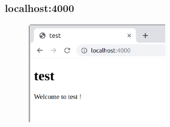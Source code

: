 \documentclass[8pt]{beamer}
\begin{document}
\begin{frame}[fragile]
  \frametitle{localhost:4000}
  \begin{figure}[h!]
    \centering
    \includegraphics[width = 6cm]{test.jpg}
    \label{localhost:4000}
  \end{figure}
\end{frame}
\end{document}
